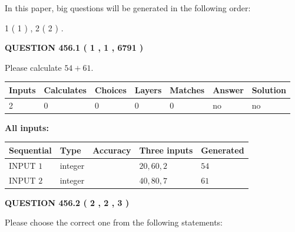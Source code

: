 \documentclass[12pt]{article}
\begin{document}
\vspace{0.2in}
   
In this paper, big questions will be generated in the following order: 
   
   
   1 ( 1 )
 ,
   2 ( 2 )
 .
  
\vspace{0.2in}
  
{\textbf{\Large{QUESTION
456.1 
 ( 1 , 1 , 6791 )
}}}
  
  
 
Please calculate $ %
54 +  %
61 $.
 
 
   
   
   
   
\noindent\begin{tabular}{|l|l|l|l|l|l|l|}
 \hline
Inputs & Calculates & Choices & Layers & Matches & Answer & Solution \\ \hline
 2  & 
 0  & 
 0
  & 
 0  & 
 0  & 
  no & 
  no 
  \\ \hline
 \end{tabular}
   
   
   
   
\noindent{}
   
   
   
   
\noindent\vspace{0.1in}\hspace{-0.08in} {\textbf{\Large{All inputs: }}}
   
   
  
  
\noindent\begin{tabular}{|l|l|l|l|l|}
\hline
 Sequential & Type & Accuracy & Three inputs & Generated \\ 
\hline
 
 
  INPUT $  1 $ & integer &  & $
 20
 , 
 60
 , 
 2
 $ & $ 54 $ 
 \\  \hline  
 
 
  INPUT $  2 $ & integer &  & $
 40
 , 
 80
 , 
 7
 $ & $ 61 $ 
 \\  \hline  
 \end{tabular}
   
   
  
\vspace{0.2in}
  
{\textbf{\Large{QUESTION
456.2 
 ( 2 , 2 , 3 )
}}}
  
  
Please choose the correct one from the following statements:
 
\end{document}
